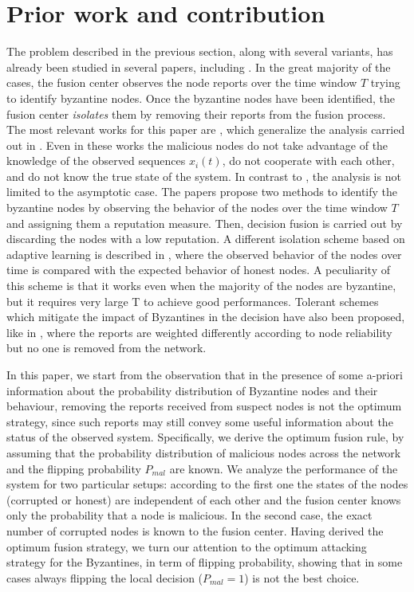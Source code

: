 \documentclass[10pt,peerreview,draftcls,onecolumn]{IEEEtran}
\begin{document}
\section{Prior work and contribution}

The problem described in the previous section, along with several variants, has already been studied in several papers, including \cite{Mar09, Raw11,CDC, Bar13}. In the great majority of the cases, the fusion center observes the node reports over the time window $T$ trying to identify byzantine nodes. Once the byzantine nodes have been identified, the fusion center {\em isolates} them by removing their reports from the fusion process.
The most relevant works for this paper are \cite{Raw11,CDC}, which generalize the analysis carried out in \cite{Mar09}. Even in these works the malicious nodes do not take advantage of the knowledge of the observed sequences $x_i(t)$, do not cooperate with each other, and do not know the true state of the system. In contrast to \cite{Mar09}, the analysis is not limited to the asymptotic case. The papers propose two methods to identify the byzantine nodes by observing the behavior of the nodes over the time window $T$ and assigning them a reputation measure. Then, decision fusion is carried out by discarding the nodes with a low reputation.  A different isolation scheme based on adaptive learning is described in \cite{LearnByzantines}, where the observed behavior of the nodes over time is compared with the expected behavior of honest nodes. A peculiarity of this scheme is that it works even when the majority of the nodes are byzantine, but it requires very large T to achieve good performances. Tolerant schemes which mitigate the impact of Byzantines in the decision have also been proposed, like in \cite{tolerant_scheme}, where the reports are weighted differently according to node reliability but no one is removed from the network.

In this paper, we start from the observation that in the presence of some a-priori information about the probability distribution of Byzantine nodes and their behaviour, removing the reports received from suspect nodes is not the optimum strategy, since such reports may still convey some useful information about the status of the observed system. Specifically, we derive the optimum fusion rule, by assuming that the probability distribution of malicious nodes across the network and the flipping probability $P_{mal}$ are known. We analyze the performance of the system for two particular setups: according to the first one the states of the nodes (corrupted or honest) are independent of each other and the fusion center knows only the probability that a node is malicious. In the second case, the exact number of corrupted nodes is known to the fusion center.  Having derived the optimum fusion strategy, we turn our attention to the optimum attacking strategy for the Byzantines, in term of flipping probability, showing that in some cases always flipping the local decision ($P_{mal} = 1$) is not the best choice.
\end{document}
